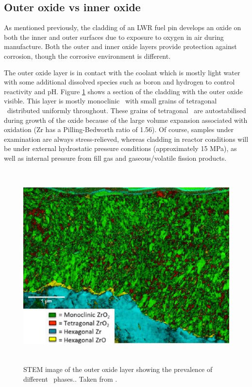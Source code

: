\subsection{Outer oxide vs inner oxide}

As mentioned previously, the cladding of an LWR fuel pin develops an oxide on both the inner and outer surfaces due to exposure to oxygen in air during manufacture. Both the outer and inner oxide layers provide protection against corrosion, though the corrosive environment is different. 

The outer oxide layer is in contact with the coolant which is mostly light water with some additional dissolved species such as boron and hydrogen to control reactivity and pH. Figure \ref{figure:outer_oxide} shows a section of the cladding with the outer oxide visible. This layer is mostly monoclinic \zirconia\ with small grains of tetragonal \zirconia\ distributed uniformly throughout. These grains of tetragonal \zirconia\ are autostabilised during growth of the oxide because of the large volume expansion associated with oxidation (Zr has a Pilling-Bedworth ratio of 1.56). Of course, samples under examination are always stress-relieved, whereas cladding in reactor conditions will be under external hydrostatic pressure conditions (approximately 15 MPa), as well as internal pressure from fill gas and gaseous/volatile fission products.

\begin{figure}[htp]
\centering
\includegraphics[height=10.5cm]{images/outer_oxide.png}
\caption[STEM image of the outer oxide layer showing the prevalence of different \zirconia\ phases.]{STEM image of the outer oxide layer showing the prevalence of different \zirconia\ phases.. Taken from \cite{Hu2016}.}
\label{figure:outer_oxide}
\end{figure}

